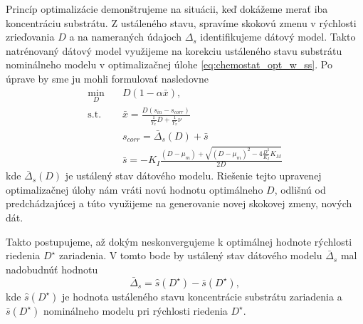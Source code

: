 Princíp optimalizácie demonštrujeme na situácii, keď dokážeme merať iba koncentráciu substrátu. Z ustáleného stavu, spravíme skokovú zmenu v rýchlosti zrieďovania $ D $ a na nameraných údajoch $ \Delta_{s} $ identifikujeme dátový model. Takto natrénovaný dátový model využijeme na korekciu ustáleného stavu substrátu nominálneho modelu v optimalizačnej úlohe \eqref{eq:chemostat_opt_w_ss}. Po úprave by sme ju mohli formulovať nasledovne
\begin{equation}
\label{eq:hybrid_opt_subs}
	\begin{split}
		\min_{D} &\quad D\left(1-\alpha\bar{x}\right), \\
		\text{s.t.} &\quad \bar{x} = \frac{D\left(s_{in}-s_{corr}\right)}{\frac{1}{Y_{x}}D + \frac{1}{Y_{x}}\nu} \\
		&\quad s_{corr} = \bar{\Delta}_{s}(D) + \bar{s}\\
		&\quad \bar{s} = -K_{I}\frac{\left(D-\mu_{m}\right) + \sqrt{\left(D-\mu_{m}\right)^2 - 4\frac{D^2}{K_{I}}K_{M}}}{2D}
	\end{split}
\end{equation}
kde $ \bar{\Delta}_{s}(D) $ je ustálený stav dátového modelu.
Riešenie tejto upravenej optimalizačnej úlohy nám vráti novú hodnotu optimálneho $ D $, odlišnú od predchádzajúcej a túto využijeme na generovanie novej skokovej zmeny, nových dát. 

Takto postupujeme, až dokým neskonvergujeme k optimálnej hodnote rýchlosti riedenia $ D^{\star} $ zariadenia. V tomto bode by ustálený stav dátového modelu $ \bar{\Delta}_s $ mal nadobudnúť hodnotu
\begin{equation}
	\bar{\Delta}_s = \hat{s}\left(D^{\star}\right) - \bar{s}\left(D^{\star}\right),
\end{equation} 
kde $ \hat{s}\left(D^{\star}\right) $ je hodnota ustáleného stavu koncentrácie substrátu zariadenia a $ \bar{s}\left(D^{\star}\right) $ nominálneho modelu pri rýchlosti riedenia $ D^{\star} $.

